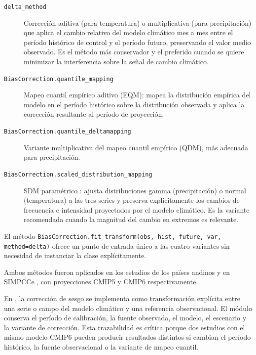 \begin{description}
  \item[\texttt{delta\_method}] Corrección aditiva (para temperatura) o multiplicativa (para precipitación) que aplica el cambio relativo del modelo climático mes a mes entre el período histórico de control y el período futuro, preservando el valor medio observado. Es el método más conservador y el preferido cuando se quiere minimizar la interferencia sobre la señal de cambio climático.

  \item[\texttt{BiasCorrection.quantile\_mapping}] Mapeo cuantil empírico aditivo (EQM): mapea la distribución empírica del modelo en el período histórico sobre la distribución observada y aplica la corrección resultante al período de proyección.

  \item[\texttt{BiasCorrection.quantile\_deltamapping}] Variante multiplicativa del mapeo cuantil empírico (QDM), más adecuada para precipitación.

  \item[\texttt{BiasCorrection.scaled\_distribution\_mapping}] SDM paramétrico \parencite{switanek2017sdm}: ajusta distribuciones gamma (precipitación) o normal (temperatura) a las tres series y preserva explícitamente los cambios de frecuencia e intensidad proyectados por el modelo climático. Es la variante recomendada cuando la magnitud del cambio en extremos es relevante.
\end{description}

El método \texttt{BiasCorrection.fit\_transform(obs, hist, future, var, method=\text{\textquotesingle}delta\text{\textquotesingle})} ofrece un punto de entrada único a las cuatro variantes sin necesidad de instanciar la clase explícitamente.

Ambos métodos fueron aplicados en los estudios de los países andinos \parencite{paz2019idb,deljesus2020andinos} y en SIMPCCe \parencite{navas2025simpce,fundacioncanal2022guiaembalses}, con proyecciones CMIP5 y CMIP6 respectivamente.

En \pyhydra, la corrección de sesgo se implementa como transformación explícita entre una serie o campo del modelo climático y una referencia observacional. El módulo conserva el período de calibración, la fuente observada, el modelo, el escenario y la variante de corrección. Esta trazabilidad es crítica porque dos estudios con el mismo modelo CMIP6 pueden producir resultados distintos si cambian el período histórico, la fuente observacional o la variante de mapeo cuantil.

